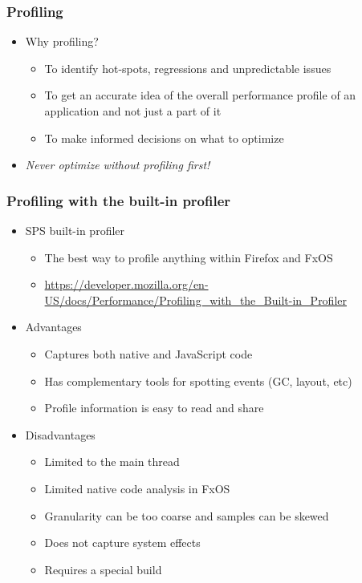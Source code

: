 \begin{frame}
 \frametitle{Profiling}
 \begin{itemize}
  \item Why profiling?
   \begin{itemize}
    \item To identify hot-spots, regressions and unpredictable issues
    \item To get an accurate idea of the overall performance profile of an
          application and not just a part of it
    \item To make informed decisions on what to optimize
   \end{itemize}
  \item \emph{Never optimize without profiling first!}
 \end{itemize}
\end{frame}

\begin{frame}
 \frametitle{Profiling with the built-in profiler}
 \begin{itemize}
  \item SPS built-in profiler
   \begin{itemize}
    \item The best way to profile anything within Firefox and FxOS
    \item \url{https://developer.mozilla.org/en-US/docs/Performance/Profiling_with_the_Built-in_Profiler}
   \end{itemize}
  \item Advantages
  \begin{itemize}
   \item Captures both native and JavaScript code
   \item Has complementary tools for spotting events (GC, layout, etc)
   \item Profile information is easy to read and share
  \end{itemize}
  \item Disadvantages
  \begin{itemize}
   \item Limited to the main thread
   \item Limited native code analysis in FxOS
   \item Granularity can be too coarse and samples can be skewed
   \item Does not capture system effects
   \item Requires a special build
  \end{itemize}
 \end{itemize}
\end{frame}

